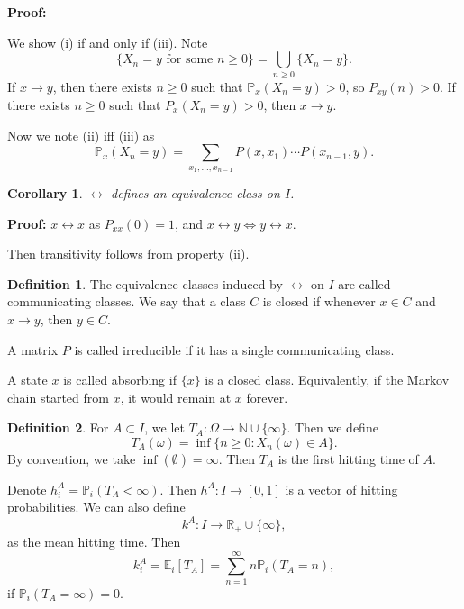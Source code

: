 \documentclass[12pt]{article}
\newtheorem{corollary}{Corollary}[section]
\theoremstyle{definition}
\newtheorem{definition}{Definition}[section]
\theoremstyle{remark}
\begin{document}
\begin{adjustbox}{minipage = \columnwidth - 25.5pt, margin=1em, frame=1pt, margin=0em}
\textbf{Proof:}

We show (i) if and only if (iii). Note
\[
	\{X_n = y \text{ for some } n \geq 0 \} = \bigcup_{n \geq 0} \{X_n = y\}
.\]
If $x \to y$, then there exists $n \geq 0$ such that $\mathbb{P}_x(X_n = y) > 0$, so $P_{xy}(n) > 0$. If there exists $n \geq 0$ such that $P_x(X_n = y) > 0$, then $x \to y$.

Now we note (ii) iff (iii) as
\[
	\mathbb{P}_x(X_n = y) = \sum_{x_1, \ldots, x_{n-1}} P(x, x_1) \cdots P(x_{n-1}, y)
.\]
\end{adjustbox}

\begin{corollary}
	$\leftrightarrow$ defines an equivalence class on $I$.
\end{corollary}
\begin{adjustbox}{minipage = \columnwidth - 25.5pt, margin=1em, frame=1pt, margin=0em}
	\textbf{Proof:} $x \leftrightarrow x$ as $P_{xx}(0) = 1$, and $x \leftrightarrow y \iff y \leftrightarrow x$.

	Then transitivity follows from property (ii).
\end{adjustbox}


\begin{definition}
	The equivalence classes induced by $\leftrightarrow$ on $I$ are called communicating classes. We say that a class $C$ is closed if whenever $x \in C$ and $x \to y$, then $y \in C$.

	A matrix $P$ is called irreducible if it has a single communicating class.

	A state $x$ is called absorbing if $\{x\}$ is a closed class. Equivalently, if the Markov chain started from $x$, it would remain at $x$ forever.
\end{definition}

\begin{definition}
	For $A \subset I$, we let $T_A : \Omega \to \mathbb{N} \cup \{\infty\}$. Then we define
	\[
		T_A(\omega) = \inf \{n \geq 0 : X_n(\omega) \in A\}
	.\]
	By convention, we take $\inf(\emptyset) = \infty$. Then $T_A$ is the first hitting time of $A$.

	Denote $h_i^{A} = \mathbb{P}_i(T_A < \infty)$. Then $h^{A} : I \to [0, 1]$ is a vector of hitting probabilities. We can also define
	\[
		k^{A} : I \to \mathbb{R}_+ \cup \{\infty\}
	,\]
	as the mean hitting time. Then
	\[
		k_i^{A} = \mathbb{E}_i[T_A] = \sum_{n =  1}^{\infty }n \mathbb{P}_i(T_A = n)
	,\]
	if $\mathbb{P}_i(T_A = \infty) = 0$.
\end{definition}
\end{document}
